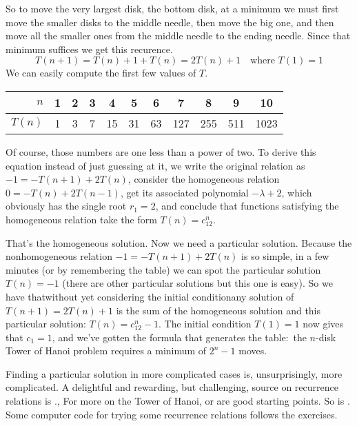 So to move the very largest disk, the bottom disk,
at a minimum we must first move the smaller disks to the middle needle, 
then move the big one,
and then move all the smaller ones from the middle needle 
to the ending needle. 
Since that minimum suffices we get this recurence.
\begin{equation*}
  T(n+1)=T(n)+1+T(n)=2T(n)+1 \quad \text{where $T(1)=1$}
\end{equation*} 
We can easily compute the first few values of $T$.
\begin{center}
  \begin{tabular}{r|cccccccccc}
    $n$    &1  &2  &3  &4  &5  &6     &7    &8    &9   &10  \\
    \hline
    $T(n)$ &1  &3  &7  &15  &31  &63  &127  &255  &511 &1023 
  \end{tabular}
\end{center}
Of course, those numbers are one less than a power of two.
To derive this equation instead of just guessing at it, 
we write the original relation as $-1=-T(n+1)+2T(n)$, consider 
the homogeneous relation $0=-T(n)+2T(n-1)$, 
get its associated polynomial $-\lambda+2$, 
which obviously has the single root $r_1=2$, and conclude that
functions satisfying the homogeneous relation take the form $T(n)=c_12^n$.

That's the homogeneous solution.
Now we need a particular solution. 
Because the nonhomogeneous relation $-1=-T(n+1)+2T(n)$ is so simple, 
in a few minutes (or by remembering the table) 
we can spot the particular solution $T(n)=-1$ 
(there are other particular 
solutions but this one is easy).
So we have that\Dash without yet considering the initial condition\Dash any solution
of $T(n+1)=2T(n)+1$ is the sum of the homogeneous solution and this
particular solution: $T(n)=c_12^n-1$.
The initial condition $T(1)=1$ now gives that $c_1=1$, and we've gotten
the formula that generates the table:~the $n$-disk Tower of Hanoi problem 
requires a minimum of $2^n-1$ moves.

Finding a particular solution in more complicated cases is, unsurprisingly,
more complicated.
A delightful and rewarding, but challenging, source on recurrence relations
is \cite{GrahamKnuthPatashnik}.,
For more on the Tower of Hanoi, \cite{Ball} or \cite{Gardner57}
are good starting points. 
So is \cite{Hofstadter}.
Some computer code for trying some recurrence relations follows the 
exercises.

